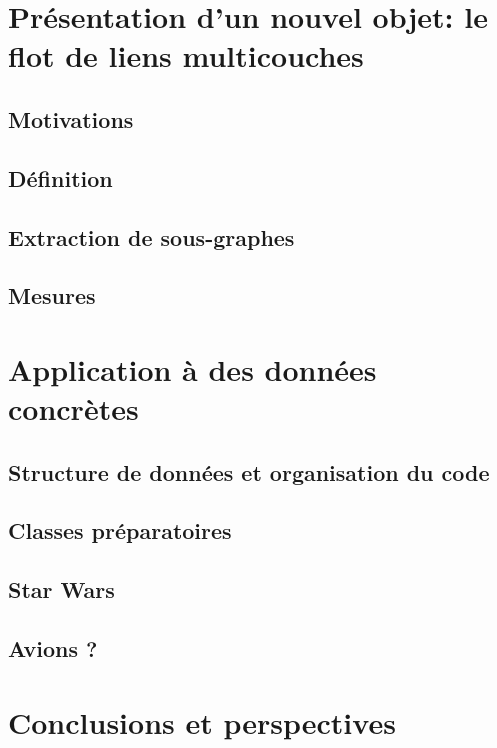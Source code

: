 \documentclass[11pt,a4paper]{article}
\begin{document}
\section{Présentation d'un nouvel objet: le flot de liens multicouches}
\subsection{Motivations}
\subsection{Définition}
\subsection{Extraction de sous-graphes}
\subsection{Mesures}



\section{Application à des données concrètes}

\subsection{Structure de données et organisation du code}
\subsection{Classes préparatoires}
\subsection{Star Wars}
\subsection{Avions ?}

\section{Conclusions et perspectives}
\end{document}
